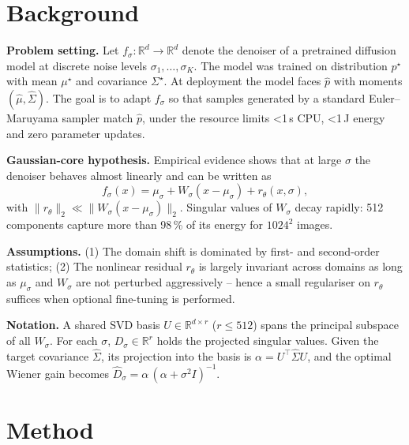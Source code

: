 \documentclass{article} %
\begin{document}
\section{Background}
\label{sec:background}
\textbf{Problem setting.} Let $f_{\sigma}:\mathbb R^{d}\!\to\!\mathbb R^{d}$ denote the denoiser of a pretrained diffusion model at discrete noise levels $\sigma_{1},\dots,\sigma_{K}$. The model was trained on distribution $p^{\star}$ with mean $\mu^{\star}$ and covariance $\Sigma^{\star}$. At deployment the model faces $\hat p$ with moments $(\hat{\mu},\hat\Sigma)$. The goal is to adapt $f_{\sigma}$ so that samples generated by a standard Euler–Maruyama sampler match $\hat p$, under the resource limits \textless{}1\,s CPU, \textless{}1\,J energy and zero parameter updates.

\textbf{Gaussian-core hypothesis.} Empirical evidence shows that at large $\sigma$ the denoiser behaves almost linearly and can be written as
\[
f_{\sigma}(x)=\mu_{\sigma}+W_{\sigma}(x-\mu_{\sigma})+r_{\theta}(x,\sigma),
\]
with $\lVert r_{\theta}\rVert_{2}\ll\lVert W_{\sigma}(x-\mu_{\sigma})\rVert_{2}$. Singular values of $W_{\sigma}$ decay rapidly: 512 components capture more than 98\,\% of its energy for $1024^{2}$ images.

\textbf{Assumptions.} (1) The domain shift is dominated by first- and second-order statistics; (2) The nonlinear residual $r_{\theta}$ is largely invariant across domains as long as $\mu_{\sigma}$ and $W_{\sigma}$ are not perturbed aggressively – hence a small regulariser on $r_{\theta}$ suffices when optional fine-tuning is performed.

\textbf{Notation.} A shared SVD basis $U\in\mathbb R^{d\times r}$ ($r\le512$) spans the principal subspace of all $W_{\sigma}$. For each $\sigma$, $D_{\sigma}\in\mathbb R^{r}$ holds the projected singular values. Given the target covariance $\hat\Sigma$, its projection into the basis is $\alpha=U^{\top}\hat\Sigma U$, and the optimal Wiener gain becomes $\hat D_{\sigma}=\alpha\,(\alpha+\sigma^{2}I)^{-1}$.

\section{Method}
\label{sec:method}
\end{document}
